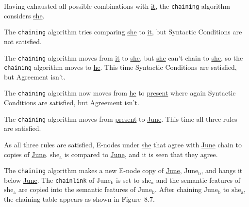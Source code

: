 \documentclass{article}
\begin{document}
\noindent Having exhausted all possible combinations with
\underline{it}, the \texttt{chaining} algorithm considers
\underline{she}.

The \texttt{chaining} algorithm tries comparing \underline{she}
to \underline{it}, but Syntactic Conditions are not satisfied.

\bigbreak
\vbox{}
\bigbreak

The \texttt{chaining} algorithm moves from \underline{it} to
\underline{she}, but \underline{she} can't chain to
\underline{she}, so the \texttt{chaining} algorithm moves to
\underline{he}.  This time Syntactic Conditions are satisfied,
but Agreement isn't.

\bigbreak
\vbox{}
\bigbreak

The \texttt{chaining} algorithm now moves from \underline{he} to
\underline{present} where again Syntactic Conditions are
satisfied, but Agreement isn't.

\bigbreak
\vbox{}
\bigbreak

The \texttt{chaining} algorithm moves from \underline{present}
to \underline{June}.  This time all three rules are satisfied.

\bigbreak
\vbox{}
\bigbreak

\noindent As all three rules are satisfied, E-nodes under
\underline{she} that agree with \underline{June} chain to copies
of \underline{June}. \underline{${\textrm{she}_{\textrm{a}}}$} is compared to
\underline{June}, and it is seen that they agree.

\bigbreak
\vbox{}
\bigbreak

\noindent The \texttt{chaining} algorithm makes a new E-node
copy of \underline{June}, \underline{${\textrm{June}_{\textrm{b}}}$}, and hangs it below
\underline{June}. The \texttt{chainlink} of \underline{${\textrm{June}_{\textrm{b}}}$} is
set to \underline{${\textrm{she}_{\textrm{a}}}$} and the semantic features of
\underline{${\textrm{she}_{\textrm{a}}}$} are copied into the semantic features of
\underline{${\textrm{June}_{\textrm{b}}}$}. After chaining \underline{${\textrm{June}_{\textrm{b}}}$} to
\underline{${\textrm{she}_{\textrm{a}}}$}, the chaining table appears as shown in
Figure~8.7.
\end{document}

